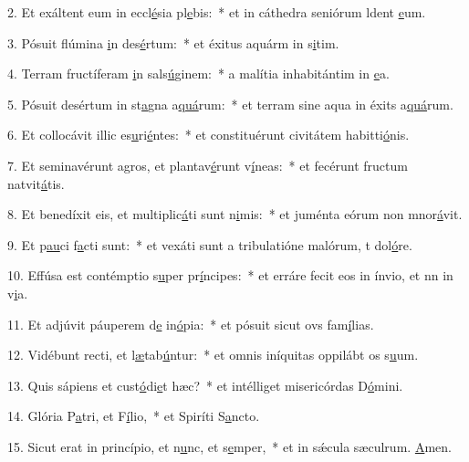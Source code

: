 2. Et exáltent eum in eccl\uline{é}sia pl\uline{e}bis:~* et in cáthedra seniórum ldent \uline{e}um.\par 
3. Pósuit flúmina \uline{i}n des\uline{é}rtum:~* et éxitus aquárm in s\uline{i}tim.\par 
4. Terram fructíferam \uline{i}n sals\uline{ú}ginem:~* a malítia inhabitántim in \uline{e}a.\par 
5. Pósuit desértum in st\uline{a}gna a\uline{quá}rum:~* et terram sine aqua in éxits a\uline{quá}rum.\par 
6. Et collocávit illic es\uline{u}ri\uline{é}ntes:~* et constituérunt civitátem habitti\uline{ó}nis.\par 
7. Et seminavérunt agros, et plantav\uline{é}runt v\uline{í}neas:~* et fecérunt fructum natvit\uline{á}tis.\par 
8. Et benedíxit eis, et multiplic\uline{á}ti sunt n\uline{i}mis:~* et juménta eórum non mnor\uline{á}vit.\par 
9. Et p\uline{au}ci f\uline{a}cti sunt:~* et vexáti sunt a tribulatióne malórum, t dol\uline{ó}re.\par 
10. Effúsa est contémptio s\uline{u}per pr\uline{í}ncipes:~* et erráre fecit eos in ínvio, et nn in v\uline{i}a.\par 
11. Et adjúvit páuperem d\uline{e} in\uline{ó}pia:~* et pósuit sicut ovs fam\uline{í}lias.\par 
12. Vidébunt recti, et l\uline{æ}tab\uline{ú}ntur:~* et omnis iníquitas oppilábt os s\uline{u}um.\par 
13. Quis sápiens et cust\uline{ó}di\uline{e}t hæc?~* et intélliget misericórdas D\uline{ó}mini.\par 
14. Glória P\uline{a}tri, et F\uline{í}lio,~* et Spiríti S\uline{a}ncto.\par 
15. Sicut erat in princípio, et n\uline{u}nc, et s\uline{e}mper,~* et in sǽcula sæculrum. \uline{A}men.\par 
